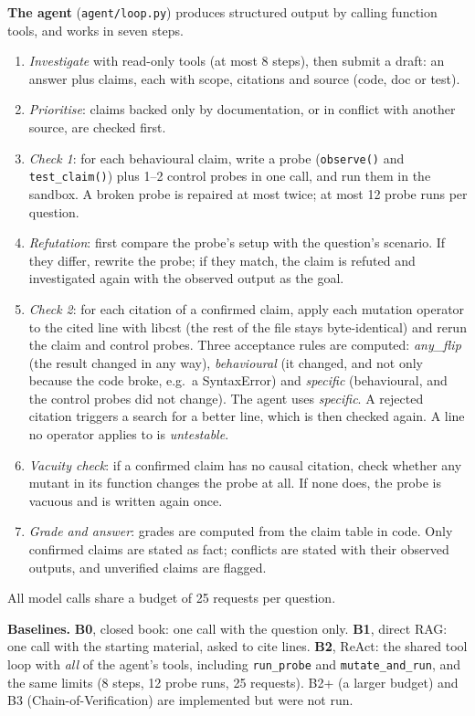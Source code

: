 \documentclass[10pt,a4paper]{article}
\newcommand{\code}[1]{\texttt{\small #1}}
\begin{document}
\textbf{The agent} (\code{agent/loop.py}) produces structured output by calling function tools, and works in seven
steps.
\begin{enumerate}
\item \emph{Investigate} with read-only tools (at most 8 steps), then submit a draft: an answer plus claims, each with
scope, citations and source (code, doc or test).
\item \emph{Prioritise}: claims backed only by documentation, or in conflict with another source, are checked first.
\item \emph{Check 1}: for each behavioural claim, write a probe (\code{observe()} and \code{test\_claim()}) plus 1--2
control probes in one call, and run them in the sandbox. A broken probe is repaired at most twice; at most 12 probe runs
per question.
\item \emph{Refutation}: first compare the probe's setup with the question's scenario. If they differ, rewrite the
probe; if they match, the claim is refuted and investigated again with the observed output as the goal.
\item \emph{Check 2}: for each citation of a confirmed claim, apply each mutation operator to the cited line with libcst
(the rest of the file stays byte-identical) and rerun the claim and control probes. Three acceptance rules are computed:
\emph{any\_flip} (the result changed in any way), \emph{behavioural} (it changed, and not only because the code broke,
e.g.\ a SyntaxError) and \emph{specific} (behavioural, and the control probes did not change). The agent uses
\emph{specific}. A rejected
citation triggers a search for a better line, which is then checked again. A line no operator applies to is
\emph{untestable}.
\item \emph{Vacuity check}: if a confirmed claim has no causal citation, check whether any mutant in its function
changes the probe at all. If none does, the probe is vacuous and is written again once.
\item \emph{Grade and answer}: grades are computed from the claim table in code. Only confirmed claims are stated as
fact; conflicts are stated with their observed outputs, and unverified claims are flagged.
\end{enumerate}
All model calls share a budget of 25 requests per question.

\textbf{Baselines.} \textbf{B0}, closed book: one call with the question only. \textbf{B1}, direct RAG: one call with the
starting material, asked to cite lines. \textbf{B2}, ReAct: the shared tool loop with \emph{all} of the agent's tools,
including \code{run\_probe} and \code{mutate\_and\_run}, and the same limits (8 steps, 12 probe runs, 25 requests).
B2+ (a larger budget) and B3 (Chain-of-Verification) are implemented but were not run.
\end{document}
